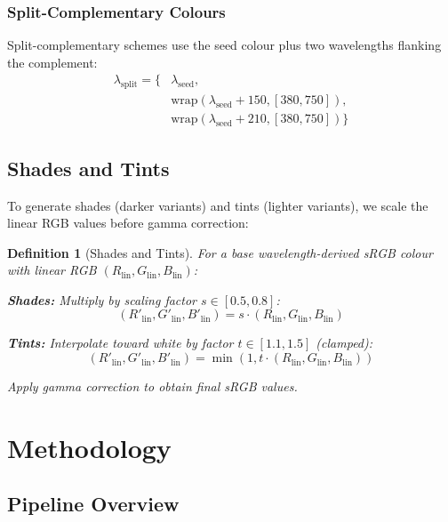 \documentclass[12pt,a4paper]{article}
\newtheorem{definition}[theorem]{Definition}
\newcommand{\wavelength}{\lambda}
\begin{document}
\subsubsection{Split-Complementary Colours}

Split-complementary schemes use the seed colour plus two wavelengths flanking the complement:
\begin{align}
\wavelength_{\text{split}} = \{ &\wavelength_{\text{seed}}, \\
&\text{wrap}(\wavelength_{\text{seed}} + 150, [380, 750]), \\
&\text{wrap}(\wavelength_{\text{seed}} + 210, [380, 750]) \}
\end{align}

\subsection{Shades and Tints}

To generate shades (darker variants) and tints (lighter variants), we scale the linear RGB values before gamma correction:

\begin{definition}[Shades and Tints]
For a base wavelength-derived sRGB colour with linear RGB $(R_{\text{lin}}, G_{\text{lin}}, B_{\text{lin}})$:

\textbf{Shades:} Multiply by scaling factor $s \in [0.5, 0.8]$:
\begin{equation}
(R'_{\text{lin}}, G'_{\text{lin}}, B'_{\text{lin}}) = s \cdot (R_{\text{lin}}, G_{\text{lin}}, B_{\text{lin}})
\end{equation}

\textbf{Tints:} Interpolate toward white by factor $t \in [1.1, 1.5]$ (clamped):
\begin{equation}
(R'_{\text{lin}}, G'_{\text{lin}}, B'_{\text{lin}}) = \min(1, t \cdot (R_{\text{lin}}, G_{\text{lin}}, B_{\text{lin}}))
\end{equation}

Apply gamma correction to obtain final sRGB values.
\end{definition}

\section{Methodology}
\label{sec:methodology}

\subsection{Pipeline Overview}
\end{document}

